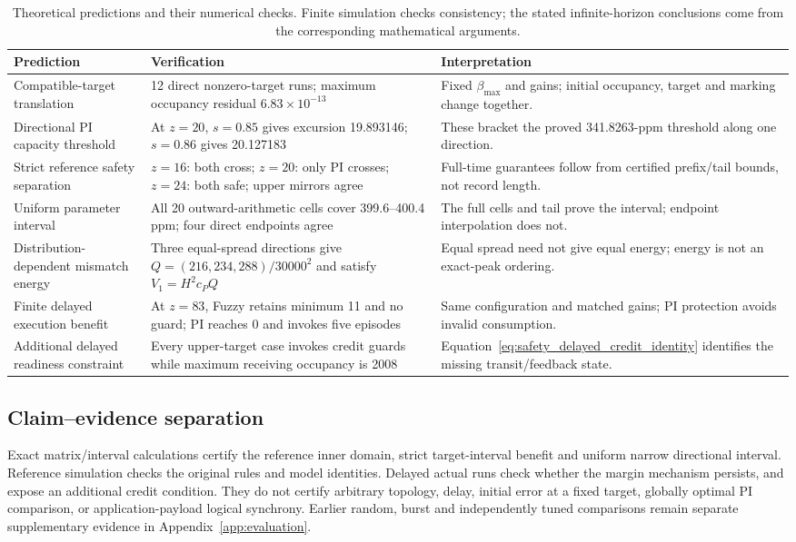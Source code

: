 \begin{table}[t]
\caption{Theoretical predictions and their numerical checks. Finite
simulation checks consistency; the stated infinite-horizon conclusions
come from the corresponding mathematical arguments.}
\label{tab:safety_prediction_evidence}
\centering
\begin{tabular}{@{}p{}p{}p{}@{}}\toprule
Prediction & Verification & Interpretation\\\midrule
Compatible-target translation & 12 direct nonzero-target runs; maximum occupancy residual $6.83\times10^{-13}$ & Fixed $\beta_{\max}$ and gains; initial occupancy, target and marking change together.\\
Directional PI capacity threshold & At $z=20$, $s=0.85$ gives excursion 19.893146; $s=0.86$ gives 20.127183 & These bracket the proved 341.8263-ppm threshold along one direction.\\
Strict reference safety separation & $z=16$: both cross; $z=20$: only PI crosses; $z=24$: both safe; upper mirrors agree & Full-time guarantees follow from certified prefix/tail bounds, not record length.\\
Uniform parameter interval & All 20 outward-arithmetic cells cover 399.6--400.4 ppm; four direct endpoints agree & The full cells and tail prove the interval; endpoint interpolation does not.\\
Distribution-dependent mismatch energy & Three equal-spread directions give $Q=(216,234,288)/30000^2$ and satisfy $V_1=H^2c_PQ$ & Equal spread need not give equal energy; energy is not an exact-peak ordering.\\
Finite delayed execution benefit & At $z=83$, Fuzzy retains minimum 11 and no guard; PI reaches 0 and invokes five episodes & Same configuration and matched gains; PI protection avoids invalid consumption.\\
Additional delayed readiness constraint & Every upper-target case invokes credit guards while maximum receiving occupancy is 2008 & Equation~\eqref{eq:safety_delayed_credit_identity} identifies the missing transit/feedback state.\\\bottomrule
\end{tabular}
\end{table}

\subsection{Claim--evidence separation}
Exact matrix/interval calculations certify the reference inner
domain, strict target-interval benefit and uniform narrow directional
interval. Reference simulation checks the original rules and model
identities. Delayed actual runs check whether the margin mechanism
persists, and expose an additional credit condition. They do not
certify arbitrary topology, delay, initial error at a fixed target,
globally optimal PI comparison, or application-payload logical
synchrony. Earlier random, burst and independently tuned comparisons
remain separate supplementary evidence in Appendix~\ref{app:evaluation}.
